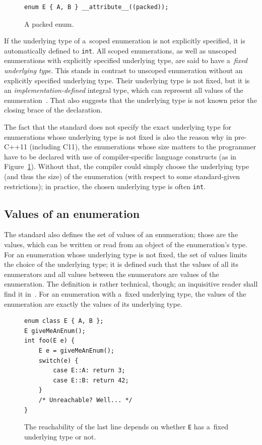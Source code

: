 \documentclass[nolot,nolof,nocover,printed]{fithesis3}
\newcommand{\stdN}[2]{\cite[#2]{#1}\xspace}
\begin{document}
\begin{figure}
\begin{lstlisting}
enum E { A, B } __attribute__((packed));
\end{lstlisting}
\caption{A packed enum.}
\label{fig:packedEnum}
\end{figure}

If the underlying type of a~scoped enumeration is not explicitly specified, it is automatically defined to \lstinline|int|. All scoped enumerations, as well as unscoped enumerations with explicitly specified underlying type, are said to have a~\textit{fixed underlying type}. This stands in contrast to unscoped enumeration without an explicitly specified underlying type. Their underlying type is not fixed, but it is an \textit{implementation-defined} integral type, which can represent all values of the enumeration~\stdN{n4296}{\S 7.2/7}. That also suggests that the underlying type is not known prior the closing brace of the declaration.

The fact that the standard does not specify the exact underlying type for enumerations whose underlying type is not fixed is also the reason why in pre-C++11 (including C11), the enumerations whose size matters to the programmer have to be declared with use of compiler-specific language constructs (as in Figure~\ref{fig:packedEnum}). Without that, the compiler could simply choose the underlying type (and thus the size) of the enumeration (with respect to some standard-given restrictions); in practice, the chosen underlying type is often \lstinline|int|.

\subsection{Values of an enumeration}

The standard also defines the set of values of an enumeration; those are the values, which can be written or read from an object of the enumeration's type. For an enumeration whose underlying type is not fixed, the set of values limits the choice of the underlying type; it is defined such that the values of all its enumerators and all values between the enumerators are values of the enumeration. The definition is rather technical, though; an inquisitive reader shall find it in~\stdN{n4296}{\S 7.2/8}. For an enumeration with a~fixed underlying type, the values of the enumeration are exactly the values of its underlying type. 

\begin{figure}
\begin{lstlisting}
enum class E { A, B };
E giveMeAnEnum();
int foo(E e) {
	E e = giveMeAnEnum();
	switch(e) {
		case E::A: return 3;
		case E::B: return 42;
	}
	/* Unreachable? Well... */
}
\end{lstlisting}
\caption{The reachability of the last line depends on whether \lstinline|E| has a~fixed underlying type or not.}
\label{fig:enumNotReallyUnreachable}
\end{figure}
\end{document}
